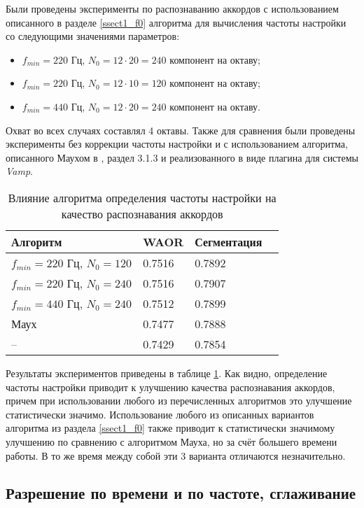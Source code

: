 Были проведены эксперименты по распознаванию аккордов с использованием
описанного в разделе \ref{ssect1_f0} алгоритма для вычисления частоты настройки
со следующими значениями параметров:
\begin{itemize}
  \item $f_{min} = 220$ Гц, $N_0 = 12 \cdot 20 = 240$ компонент на октаву;
  \item $f_{min} = 220$ Гц, $N_0 = 12 \cdot 10 = 120$ компонент на октаву;
  \item $f_{min} = 440$ Гц, $N_0 = 12 \cdot 20 = 240$ компонент на октаву.
\end{itemize}
Охват во всех случаях составлял 4 октавы. Также для сравнения были проведены
эксперименты без коррекции частоты настройки и с использованием алгоритма,
описанного Маухом в \cite{MauchThesis2010}, раздел 3.1.3 и реализованного в виде
плагина для системы \emph{Vamp}.

\begin{table} [htbp]
  \centering
  \parbox{15cm}{\caption{Влияние алгоритма определения частоты настройки на
  качество распознавания аккордов} \label{TTunFreq}}
  \begin{tabular}{|l|l|l|l|}
  \hline
  Алгоритм & WAOR & Сегментация \\
  \hline
  $f_{min} = 220$ Гц, $N_0 = 120$ & 0.7516 & 0.7892 \\
  $f_{min} = 220$ Гц, $N_0 = 240$ & 0.7516 & 0.7907 \\
  $f_{min} = 440$ Гц, $N_0 = 240$ & 0.7512 & 0.7899 \\
  Маух \cite{MauchThesis2010} & 0.7477 & 0.7888 \\
  -- & 0.7429 & 0.7854 \\
  \hline
  \end{tabular}
\end{table}

Результаты экспериментов приведены в таблице \ref{TTunFreq}. Как видно,
определение частоты настройки приводит к улучшению качества распознавания
аккордов, причем при использовании любого из перечисленных алгоритмов это
улучшение статистически значимо. Использование любого из описанных вариантов
алгоритма из раздела \ref{ssect1_f0} также приводит к статистически значимому
улучшению по сравнению с алгоритмом Мауха, но за счёт большего времени работы. В
то же время между собой эти 3 варианта отличаются незначительно.

\subsection{Разрешение по времени и по частоте, сглаживание}

